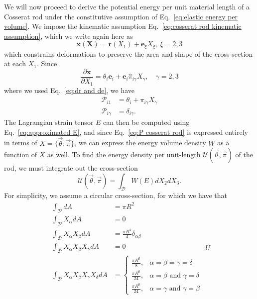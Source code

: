 We will now proceed to derive the potential energy per unit material length of a Cosserat rod under the constitutive assumption of Eq.~\ref{eq:elastic energy per volume}. We impose the kinematic assumption Eq.~\ref{eq:cosserat rod kinematic assumption}, which we write again here as
\begin{equation}
\mathbf{x}(\mathbf{X})=\mathbf{r}(X_{1})+\mathbf{e}_{\xi}X_{\xi},\ \xi=2,3\label{eq:deformation assumption}
\end{equation}
which constrains deformations to preserve the area and shape of the cross-section at each $X_{1}$. Since
\begin{equation}
\frac{\partial \mathbf{x}}{\partial X_1} = \theta_i \mathbf{e}_i + \mathbf{e}_i \hat{\pi}_{i \gamma} X_\gamma, \quad \gamma = 2,3
\end{equation}
where we used Eq.~\ref{eq:dr and de}, we have
\begin{equation} \label{eq:P cosserat rod}
\begin{aligned}
\mathcal{P}_{i1} & =\theta_{i}+ \pi_{i \gamma} X_{\gamma}\\
\mathcal{P}_{i\gamma} & =\delta_{i\gamma}.
\end{aligned}
\end{equation}
The Lagrangian strain tensor $E$ can then be computed using Eq.~\ref{eq:approximated E}, and since Eq.~\ref{eq:P cosserat rod} is expressed entirely in terms of $X = \{ \vec{\theta} ; \vec{\pi} \}$, we can express the energy volume density $W$ as a function of $X$ as well. To find the energy density per unit-length $\mathcal{U}(\vec{\theta}, \vec{\pi})$ of the rod, we must integrate out the cross-section
\begin{equation}
\mathcal{U}(\vec{\theta}, \vec{\pi})=\int_{\mathscr{D}}W(E)dX_{2}dX_{3}.
\end{equation}
For simplicity, we assume a circular cross-section, for which we have that
\begin{equation} \label{eq:cross section integrals}
\begin{aligned}\int_{\mathscr{D}}dA & =\pi R^{2}\\
\int_{\mathscr{D}}X_{\alpha}dA & =0\\
\int_{\mathscr{D}}X_{\alpha}X_{\beta}dA & =\frac{\pi R^{4}}{4}\delta_{\alpha\beta}\\
\int_{\mathscr{D}}X_{\alpha}X_{\beta}X_{\gamma}dA & =0\\
\int_{\mathscr{D}}X_{\alpha}X_{\beta}X_{\gamma}X_{\delta}dA & =\begin{cases}
\frac{\pi R^{6}}{8}, & \alpha=\beta=\gamma=\delta\\
\frac{\pi R^{6}}{24}, & \alpha=\beta\text{ and }\gamma=\delta\\
\frac{\pi R^{6}}{24}, & \alpha=\gamma\text{ and }\gamma=\beta
\end{cases}
\end{aligned}
{U}
\end{equation}
